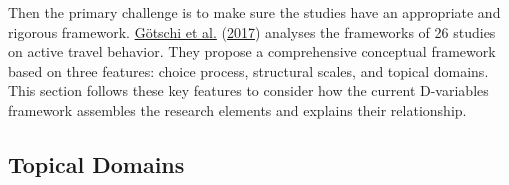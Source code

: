 \documentclass[
  12pt,
]{article}
\begin{document}
Then the primary challenge is to make sure the studies have an appropriate and rigorous framework. \protect\hyperlink{ref-gotschiComprehensiveConceptualFramework2017}{Götschi et al.} (\protect\hyperlink{ref-gotschiComprehensiveConceptualFramework2017}{2017}) analyses the frameworks of 26 studies on active travel behavior. They propose a comprehensive conceptual framework based on three features: choice process, structural scales, and topical domains. This section follows these key features to consider how the current D-variables framework assembles the research elements and explains their relationship.

\hypertarget{topical-domains}{%
\subsection{Topical Domains}\label{topical-domains}}
\end{document}
